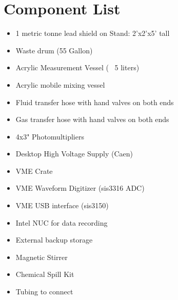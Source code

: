 \documentclass[]{article}
\begin{document}
\section{Component List}
\begin{itemize}
  \item 1 metric tonne lead shield on Stand: 2'x2'x5' tall
  \item Waste drum (55 Gallon)
  \item Acrylic Measurement Vessel (~ 5 liters)
  \item Acrylic mobile mixing vessel
  \item Fluid transfer hose with hand valves on both ends
  \item Gas transfer hose with hand valves on both ends
  \item 4x3" Photomultipliers
  \item Desktop High Voltage Supply (Caen)
  \item VME Crate
  \item VME Waveform Digitizer (sis3316 ADC)
  \item VME USB interface (sis3150)
  \item Intel NUC for data recording
  \item External backup storage
  \item Magnetic Stirrer
  \item Chemical Spill Kit
  \item Tubing to connect
\end{itemize}
\end{document}
